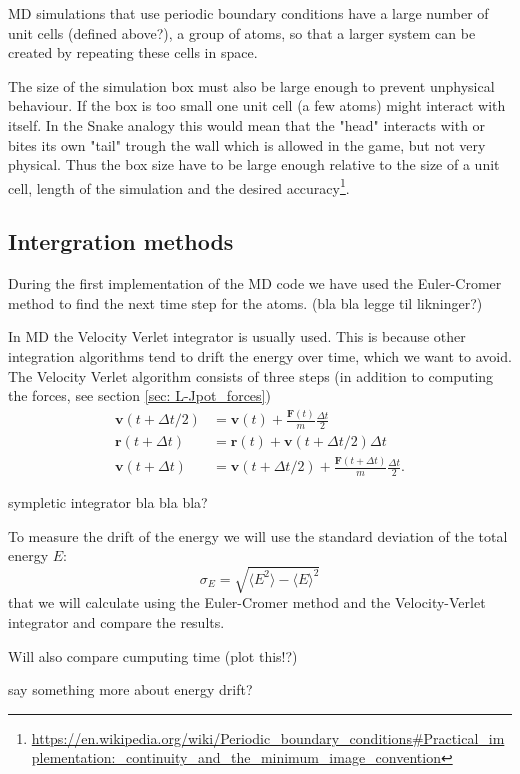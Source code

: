 \documentclass[11pt,a4wide]{article}
\renewcommand{\vec}{\mathbf}
\begin{document}
MD simulations that use periodic boundary conditions have a large number of unit cells (defined above?), a group of atoms, so that a larger system can be created by repeating these cells in space. 

The size of the simulation box must also be large enough to prevent unphysical behaviour. If the box is too small one unit cell (a few atoms) might interact with itself. In the Snake analogy this would mean that the "head" interacts with or bites its own "tail" trough the wall which is allowed in the game, but not very physical. Thus the box size have to be large enough relative to the size of a unit cell, length of the simulation and the desired accuracy\footnote{\url{https://en.wikipedia.org/wiki/Periodic\_boundary\_conditions\#Practical\_implementation:\_continuity\_and\_the\_minimum\_image\_convention}}.


\subsection{Intergration methods} \label{sec: int_methods}
During the first implementation of the MD code we have used the Euler-Cromer method to find the next time step for the atoms. (bla bla legge til likninger?)

In MD the Velocity Verlet integrator is usually used. This is because other integration algorithms tend to drift the energy over time, which we want to avoid. The Velocity Verlet algorithm consists of three steps (in addition to computing the forces, see section \ref{sec: L-Jpot_forces})
\begin{align}
	\vec v(t + \Delta t/2) &= \vec v(t) + \frac{\vec F(t)}{m}\frac{\Delta t}{2}\\
	\vec r(t + \Delta t) &= \vec r(t) + \vec v(t + \Delta t/2)\Delta t\\
	\vec v(t + \Delta t) &= \vec v(t + \Delta t/2) + \frac{\vec F(t + \Delta t)}{m}\frac{\Delta t}{2}.
\end{align}

sympletic integrator bla bla bla?

To measure the drift of the energy we will use the standard deviation of the total energy $E$:
\[
\sigma_E = \sqrt{\langle E^2 \rangle - \langle E \rangle^2}
\]
that we will calculate using the Euler-Cromer method and the Velocity-Verlet integrator and compare the results.

Will also compare cumputing time (plot this!?)

say something more about energy drift?
\end{document}
